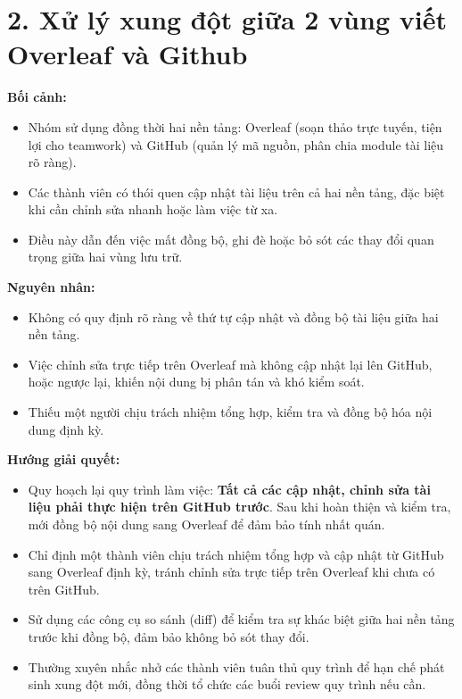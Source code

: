 \documentclass[12pt,a4paper]{article}
\begin{document}
\section*{2. Xử lý xung đột giữa 2 vùng viết Overleaf và Github}

\textbf{Bối cảnh:}
\begin{itemize}
    \item Nhóm sử dụng đồng thời hai nền tảng: Overleaf (soạn thảo trực tuyến, tiện lợi cho teamwork) và GitHub (quản lý mã nguồn, phân chia module tài liệu rõ ràng).
    \item Các thành viên có thói quen cập nhật tài liệu trên cả hai nền tảng, đặc biệt khi cần chỉnh sửa nhanh hoặc làm việc từ xa.
    \item Điều này dẫn đến việc mất đồng bộ, ghi đè hoặc bỏ sót các thay đổi quan trọng giữa hai vùng lưu trữ.
\end{itemize}

\textbf{Nguyên nhân:}
\begin{itemize}
    \item Không có quy định rõ ràng về thứ tự cập nhật và đồng bộ tài liệu giữa hai nền tảng.
    \item Việc chỉnh sửa trực tiếp trên Overleaf mà không cập nhật lại lên GitHub, hoặc ngược lại, khiến nội dung bị phân tán và khó kiểm soát.
    \item Thiếu một người chịu trách nhiệm tổng hợp, kiểm tra và đồng bộ hóa nội dung định kỳ.
\end{itemize}

\textbf{Hướng giải quyết:}
\begin{itemize}
    \item Quy hoạch lại quy trình làm việc: \textbf{Tất cả các cập nhật, chỉnh sửa tài liệu phải thực hiện trên GitHub trước}. Sau khi hoàn thiện và kiểm tra, mới đồng bộ nội dung sang Overleaf để đảm bảo tính nhất quán.
    \item Chỉ định một thành viên chịu trách nhiệm tổng hợp và cập nhật từ GitHub sang Overleaf định kỳ, tránh chỉnh sửa trực tiếp trên Overleaf khi chưa có trên GitHub.
    \item Sử dụng các công cụ so sánh (diff) để kiểm tra sự khác biệt giữa hai nền tảng trước khi đồng bộ, đảm bảo không bỏ sót thay đổi.
    \item Thường xuyên nhắc nhở các thành viên tuân thủ quy trình để hạn chế phát sinh xung đột mới, đồng thời tổ chức các buổi review quy trình nếu cần.
\end{itemize}
\label{LastPageTeamConflictSolving}
\end{document}
